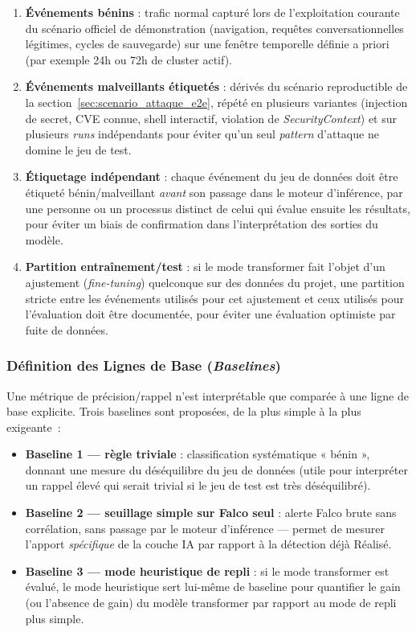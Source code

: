 \begin{enumerate}
    \item \textbf{Événements bénins} : trafic normal capturé lors de l'exploitation courante du scénario officiel de démonstration (navigation, requêtes conversationnelles légitimes, cycles de sauvegarde) sur une fenêtre temporelle définie a priori (par exemple 24h ou 72h de cluster actif).
    \item \textbf{Événements malveillants étiquetés} : dérivés du scénario reproductible de la section~\ref{sec:scenario_attaque_e2e}, répété en plusieurs variantes (injection de secret, CVE connue, shell interactif, violation de \textit{SecurityContext}) et sur plusieurs \textit{runs} indépendants pour éviter qu'un seul \textit{pattern} d'attaque ne domine le jeu de test.
    \item \textbf{Étiquetage indépendant} : chaque événement du jeu de données doit être étiqueté bénin/malveillant \emph{avant} son passage dans le moteur d'inférence, par une personne ou un processus distinct de celui qui évalue ensuite les résultats, pour éviter un biais de confirmation dans l'interprétation des sorties du modèle.
    \item \textbf{Partition entraînement/test} : si le mode transformer fait l'objet d'un ajustement (\textit{fine-tuning}) quelconque sur des données du projet, une partition stricte entre les événements utilisés pour cet ajustement et ceux utilisés pour l'évaluation doit être documentée, pour éviter une évaluation optimiste par fuite de données.
\end{enumerate}

\subsubsection{Définition des Lignes de Base (\textit{Baselines})}

Une métrique de précision/rappel n'est interprétable que comparée à une ligne de base explicite. Trois baselines sont proposées, de la plus simple à la plus exigeante~:

\begin{itemize}
    \item \textbf{Baseline 1 — règle triviale} : classification systématique « bénin », donnant une mesure du déséquilibre du jeu de données (utile pour interpréter un rappel élevé qui serait trivial si le jeu de test est très déséquilibré).
    \item \textbf{Baseline 2 — seuillage simple sur Falco seul} : alerte Falco brute sans corrélation, sans passage par le moteur d'inférence — permet de mesurer l'apport \emph{spécifique} de la couche IA par rapport à la détection déjà Réalisé.
    \item \textbf{Baseline 3 — mode heuristique de repli} : si le mode transformer est évalué, le mode heuristique sert lui-même de baseline pour quantifier le gain (ou l'absence de gain) du modèle transformer par rapport au mode de repli plus simple.
\end{itemize}

